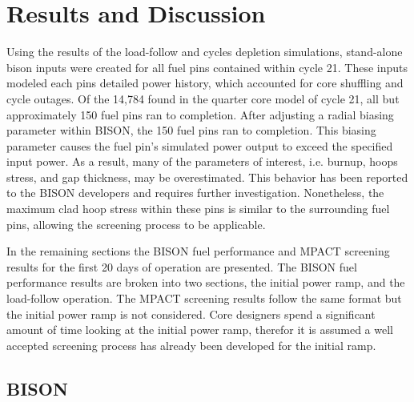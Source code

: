 \documentclass[edeposit,fullpage,11pt]{uiucthesis2009}
\begin{document}



\chapter{Results and Discussion}
Using the results of the load-follow and  cycles depletion simulations, stand-alone bison inputs were created for all fuel pins contained within cycle 21. 
These inputs modeled each pins detailed power history, which accounted for core shuffling and cycle outages. 
Of the 14,784 found in the quarter core model of cycle 21, all but approximately 150 fuel pins ran to completion.
After adjusting a radial biasing parameter within BISON, the 150 fuel pins ran to completion.
This biasing parameter causes the fuel pin's simulated power output to exceed the specified input power.
As a result, many of the parameters of interest, i.e. burnup, hoops stress, and gap thickness, may be overestimated.
This behavior has been reported to the BISON developers and requires further investigation. 
Nonetheless, the maximum clad hoop stress within these pins is similar to the surrounding fuel pins, allowing the screening process to be applicable.

In the remaining sections the BISON fuel performance and MPACT screening results for the first 20 days of operation are presented.
The BISON fuel performance results are broken into two sections, the initial power ramp, and the load-follow operation.
The MPACT screening results follow the same format but the initial power ramp is not considered. 
Core designers spend a significant amount of time looking at the initial power ramp, therefor it is assumed a well accepted screening process has already been developed for the initial ramp.

\section{BISON}
\end{document}
